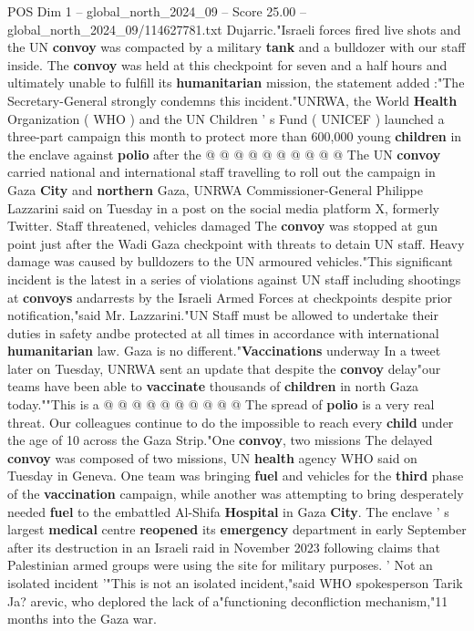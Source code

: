 \begin{textsample}{POS Dim 1 – global\_north\_2024\_09 – Score 25.00 – global\_north\_2024\_09/114627781.txt}
Dujarric."Israeli forces fired live shots and the UN \textbf{convoy} was compacted by a military \textbf{tank} and a bulldozer with our staff inside.
The \textbf{convoy} was held at this checkpoint for seven and a half hours and ultimately unable to fulfill its \textbf{humanitarian} mission, the statement added :"The Secretary-General strongly condemns this incident."UNRWA, the World \textbf{Health} Organization ( WHO ) and the UN Children ' s Fund ( UNICEF ) launched a three-part campaign this month to protect more than 600,000 young \textbf{children} in the enclave against \textbf{polio} after the @ @ @ @ @ @ @ @ @ @ The UN \textbf{convoy} carried national and international staff travelling to roll out the campaign in Gaza \textbf{City} and \textbf{northern} Gaza, UNRWA Commissioner-General Philippe Lazzarini said on Tuesday in a post on the social media platform X, formerly Twitter.
Staff threatened, vehicles damaged The \textbf{convoy} was stopped at gun point just after the Wadi Gaza checkpoint with threats to detain UN staff.
Heavy damage was caused by bulldozers to the UN armoured vehicles."This significant incident is the latest in a series of violations against UN staff including shootings at \textbf{convoys} andarrests by the Israeli Armed Forces at checkpoints despite prior notification,"said Mr.
Lazzarini."UN Staff must be allowed to undertake their duties in safety andbe protected at all times in accordance with international \textbf{humanitarian} law.
Gaza is no different."\textbf{Vaccinations} underway In a tweet later on Tuesday, UNRWA sent an update that despite the \textbf{convoy} delay"our teams have been able to \textbf{vaccinate} thousands of \textbf{children} in north Gaza today.""This is a @ @ @ @ @ @ @ @ @ @ The spread of \textbf{polio} is a very real threat.
Our colleagues continue to do the impossible to reach every \textbf{child} under the age of 10 across the Gaza Strip."One \textbf{convoy}, two missions The delayed \textbf{convoy} was composed of two missions, UN \textbf{health} agency WHO said on Tuesday in Geneva.
One team was bringing \textbf{fuel} and vehicles for the \textbf{third} phase of the \textbf{vaccination} campaign, while another was attempting to bring desperately needed \textbf{fuel} to the embattled Al-Shifa \textbf{Hospital} in Gaza \textbf{City}.
The enclave ' s largest \textbf{medical} centre \textbf{reopened} its \textbf{emergency} department in early September after its destruction in an Israeli raid in November 2023 following claims that Palestinian armed groups were using the site for military purposes. ' Not an isolated incident '"This is not an isolated incident,"said WHO spokesperson Tarik Ja? arevic, who deplored the lack of a"functioning deconfliction mechanism,"11 months into the Gaza war.

\end{textsample}

